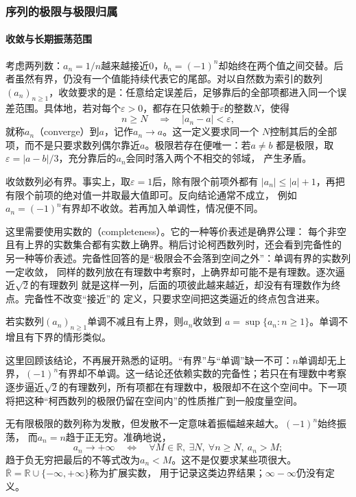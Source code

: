 \subsubsection{序列的极限与极限归属}

\paragraph{收敛与长期振荡范围}

考虑两列数：$a_n=1/n$越来越接近$0$，$b_n=(-1)^n$却始终在两个值之间交替。后者虽然有界，仍没有一个值能持续代表它的尾部。对以自然数为索引的数列$(a_n)_{n\geq1}$，收敛要求的是：任意给定误差后，足够靠后的全部项都进入同一个误差范围。具体地，若对每个$\varepsilon>0$，都存在只依赖于$\varepsilon$的整数$N$，使得
\[   n\geq N\quad\Longrightarrow\quad |a_n-a|<\varepsilon, \]
就称$a_n$（converge）到$a$，记作$a_n\to a$。这一定义要求同一个 $N$控制其后的全部项，而不是只要求数列偶尔靠近$a$。极限若存在便唯一：若$a\neq b$ 都是极限，取$\varepsilon=|a-b|/3$，充分靠后的$a_n$会同时落入两个不相交的邻域， 产生矛盾。

收敛数列必有界。事实上，取$\varepsilon=1$后，除有限个前项外都有 $|a_n|\leq |a|+1$，再把有限个前项的绝对值一并取最大值即可。反向结论通常不成立， 例如$a_n=(-1)^n$有界却不收敛。若再加入单调性，情况便不同。

这里需要使用实数的（completeness）。它的一种等价表述是确界公理：
每个非空且有上界的实数集合都有实数上确界。稍后讨论柯西数列时，还会看到完备性的
另一种等价表述。完备性回答的是“极限会不会落到空间之外”：单调有界的实数列一定收敛，
同样的数列放在有理数中考察时，上确界却可能不是有理数。逐次逼近$\sqrt2$的有理数列
就是这样一列，后面的项彼此越来越近，却没有有理数作为终点。完备性不改变“接近”的
定义，只要求空间把这类逼近的终点包含进来。
\begin{theorem}[单调有界收敛定理]
\label{thm:analysis-monotone-bounded-sequence}
若实数列$(a_n)_{n\geq1}$单调不减且有上界，则$a_n$收敛到 $a=\sup\{a_n:n\geq1\}$。单调不增且有下界的情形类似。
\end{theorem}
这里回顾该结论，不再展开熟悉的证明。“有界”与“单调”缺一不可：$n$单调却无上界，$(-1)^n$有界却不单调。这一结论还依赖实数的完备性；若只在有理数中考察逐步逼近$\sqrt{2}$的有理数列，所有项都在有理数中，极限却不在这个空间中。下一项将把这种“柯西数列的极限仍留在空间内”的性质推广到一般度量空间。

无有限极限的数列称为发散，但发散不一定意味着振幅越来越大。$(-1)^n$始终振荡，
而$a_n=n$趋于正无穷。准确地说，
\[
 a_n\to+\infty
 \quad\Longleftrightarrow\quad
 \forall M\in\mathbb R,\ \exists N,\ \forall n\geq N,\ a_n>M;
\]
趋于负无穷把最后的不等式改为$a_n<M$。这不是仅要求某些项很大。
$\overline{\mathbb R}=\mathbb R\cup\{-\infty,+\infty\}$称为扩展实数，
用于记录这类边界结果；$\infty-\infty$仍没有定义。

